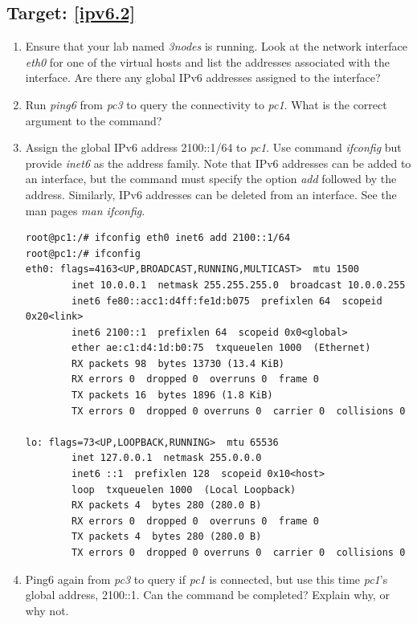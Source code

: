 \documentclass[12pt]{book}
\begin{document}
\subsection{Target: \ref{ipv6.2}}\label{ipv6.2.se}

\begin{enumerate}[resume*]
\item Ensure that your lab named \emph{3nodes} is running. Look at the network interface \emph{eth0} for one of the virtual hosts and list the addresses associated with the interface. Are there any global IPv6 addresses assigned to the interface?

\item Run \emph{ping6} from \emph{pc3} to query the connectivity to \emph{pc1}. What is the correct argument to the command?

\item Assign the global IPv6 address 2100::1/64 to \emph{pc1}. Use command \emph{ifconfig} but provide \emph{inet6} as the address family. Note that IPv6 addresses can be added to an interface, but the command must specify the option \emph{add} followed by the address. Similarly, IPv6 addresses can be deleted from an interface. See the man pages \emph{man ifconfig}.

  \begin{lstlisting}
root@pc1:/# ifconfig eth0 inet6 add 2100::1/64
root@pc1:/# ifconfig
eth0: flags=4163<UP,BROADCAST,RUNNING,MULTICAST>  mtu 1500
        inet 10.0.0.1  netmask 255.255.255.0  broadcast 10.0.0.255
        inet6 fe80::acc1:d4ff:fe1d:b075  prefixlen 64  scopeid 0x20<link>
        inet6 2100::1  prefixlen 64  scopeid 0x0<global>
        ether ae:c1:d4:1d:b0:75  txqueuelen 1000  (Ethernet)
        RX packets 98  bytes 13730 (13.4 KiB)
        RX errors 0  dropped 0  overruns 0  frame 0
        TX packets 16  bytes 1896 (1.8 KiB)
        TX errors 0  dropped 0 overruns 0  carrier 0  collisions 0

lo: flags=73<UP,LOOPBACK,RUNNING>  mtu 65536
        inet 127.0.0.1  netmask 255.0.0.0
        inet6 ::1  prefixlen 128  scopeid 0x10<host>
        loop  txqueuelen 1000  (Local Loopback)
        RX packets 4  bytes 280 (280.0 B)
        RX errors 0  dropped 0  overruns 0  frame 0
        TX packets 4  bytes 280 (280.0 B)
        TX errors 0  dropped 0 overruns 0  carrier 0  collisions 0
  \end{lstlisting}

\item Ping6 again from \emph{pc3} to query if \emph{pc1} is connected, but use this time \emph{pc1}'s global address, 2100::1. Can the command be completed? Explain why, or why not.


\end{enumerate}
\end{document}
